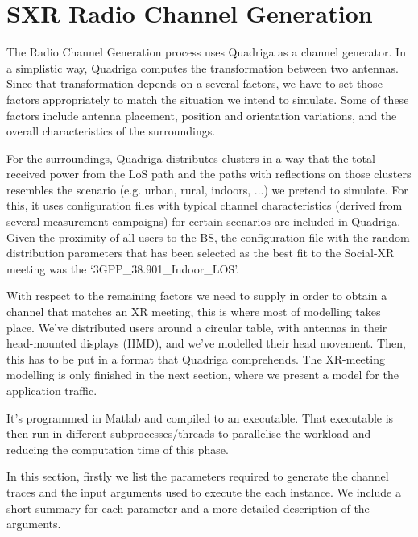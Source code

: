 \section{SXR Radio Channel Generation}
\label{sec:implementation}




The Radio Channel Generation process uses Quadriga as a channel generator. 
In a simplistic way, Quadriga computes the transformation between two antennas. Since that transformation depends on a several factors, we have to set those factors appropriately to match the situation we intend to simulate. Some of these factors include antenna placement, position and orientation variations, and the overall characteristics of the surroundings.


For the surroundings, Quadriga distributes clusters in a way that the total received power from the LoS path and the paths with reflections on those clusters resembles the scenario (e.g. urban, rural, indoors, ...) we pretend to simulate. For this, it uses configuration files with typical channel characteristics (derived from several measurement campaigns) for certain scenarios are included in Quadriga. Given the proximity of all users to the BS, the configuration file with the random distribution parameters that has been selected as the best fit to the Social-XR meeting was the `3GPP\_38.901\_Indoor\_LOS'.

With respect to the remaining factors we need to supply in order to obtain a channel that matches an XR meeting, this is where most of modelling takes place. We've distributed users around a circular table, with antennas in their head-mounted displays (HMD), and we've modelled their head movement. Then, this has to be put in a format that Quadriga comprehends. The XR-meeting modelling is only finished in the next section, where we present a model for the application traffic.

It's programmed in Matlab and compiled to an executable. That executable is then run in different subprocesses/threads to parallelise the workload and reducing the computation time of this phase.


In this section, firstly we list the parameters required to generate the channel traces and the input arguments used to execute the each instance. We include a short summary for each parameter and a more detailed description of the arguments.

